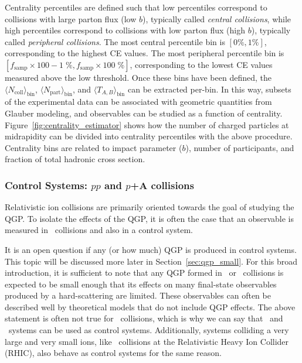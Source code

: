 Centrality percentiles are defined such that low percentiles correspond to collisions with large parton flux (low $b$), typically called \textit{central collisions}, while high percentiles correspond to collisions with low parton flux (high $b$), typically called \textit{peripheral collisions}.
The most central percentile bin is $\left[0\%,1\%\right]$, corresponding to the highest CE values. The most peripheral percentile bin is $\left[f_{\mathrm{samp}} \times 100 - 1 \;\%, f_{\mathrm{samp}} \times 100\;\%\right]$, corresponding to the lowest CE values measured above the low threshold.
Once these bins have been defined, the $\langle N_{\mathrm{coll}} \rangle_{\mathrm{bin}}$, $\langle N_{\mathrm{part}} \rangle_{\mathrm{bin}}$, and $\langle T_{A,B}\rangle_{\mathrm{bin}}$ can be extracted per-bin.
In this way, subsets of the experimental data can be associated with geometric quantities from Glauber modeling, and observables can be studied as a function of centrality.
Figure~\ref{fig:centrality_estimator} shows how the number of charged particles at midrapidity can be divided into centrality percentiles with the above procedure.
Centrality bins are related to impact parameter ($b$), number of participants, and fraction of total hadronic cross section.
\subsubsection{\texorpdfstring{Control Systems: $pp$ and $p$+A collisions}{Control Systems: pp and p+A collisions}}
Relativistic ion collisions are primarily oriented towards the goal of studying the QGP.
To isolate the effects of the QGP, it is often the case that an observable is measured in \AxA\ collisions and also in a control system.

It is an open question if any (or how much) QGP is produced in control systems.
This topic will be discussed more later in Section~\ref{sec:qgp_small}.
For this broad introduction, it is sufficient to note that any QGP formed in \pxp\ or \pxA\ collisions is expected to be small enough that its effects on many final-state observables produced by a hard-scattering are limited.
These observables can often be described well by theoretical models that do not include QGP effects.
The above statement is often not true for \AxA\ collisions, which is why we can say that \pxp\ and \pxA\ systems can be used as control systems.
Additionally, systems colliding a very large and very small ions, like \dxAu\ collisions at the Relativistic Heavy Ion Collider (RHIC), also behave as control systems for the same reason.

